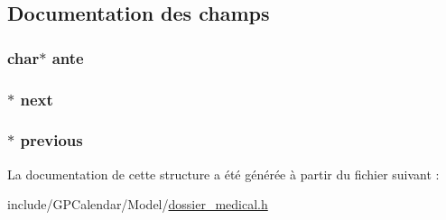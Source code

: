 \subsection{Documentation des champs}
\hypertarget{struct_node_antecedent_a0c3929ebda710960d6b68a88c77f2254}{
\subsubsection[{ante}]{\setlength{\rightskip}{0pt plus 5cm}char$\ast$ ante}}\label{struct_node_antecedent_a0c3929ebda710960d6b68a88c77f2254}
\hypertarget{struct_node_antecedent_a8273a14f46fbc8204294f8db5e3ea9e6}{
\subsubsection[{next}]{$\ast$ next}}\label{struct_node_antecedent_a8273a14f46fbc8204294f8db5e3ea9e6}
\hypertarget{struct_node_antecedent_a92d57ada68813cf417c5471a1458927a}{
\subsubsection[{previous}]{$\ast$ previous}}\label{struct_node_antecedent_a92d57ada68813cf417c5471a1458927a}


La documentation de cette structure a été générée à partir du fichier suivant \-:\begin{DoxyCompactItemize}
\item 
include/\-G\-P\-Calendar/\-Model/\hyperlink{dossier__medical_8h}{dossier\-\_\-medical.\-h}\end{DoxyCompactItemize}
